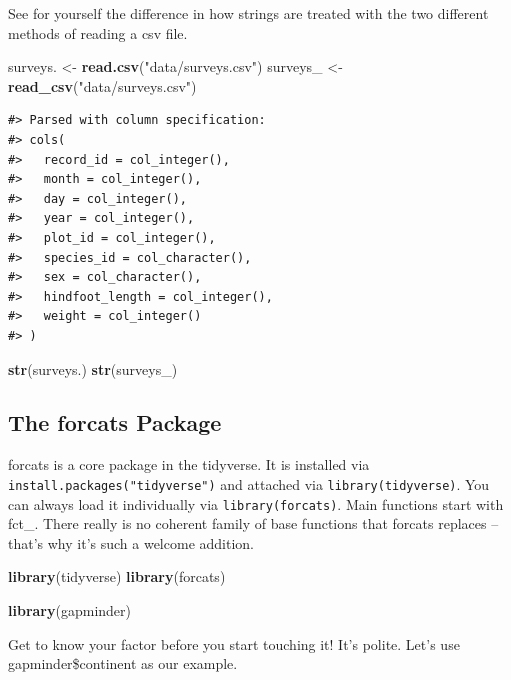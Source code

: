 \documentclass[]{book}
\newenvironment{Shaded}{\begin{snugshade}}{\end{snugshade}}
\newcommand{\KeywordTok}[1]{\textcolor[rgb]{0.13,0.29,0.53}{\textbf{#1}}}
\newcommand{\StringTok}[1]{\textcolor[rgb]{0.31,0.60,0.02}{#1}}
\newcommand{\NormalTok}[1]{#1}
\begin{document}
See for yourself the difference in how strings are treated with the two
different methods of reading a csv file.

\begin{Shaded}
\begin{Highlighting}[]
\NormalTok{surveys. <-}\StringTok{ }\KeywordTok{read.csv}\NormalTok{(}\StringTok{"data/surveys.csv"}\NormalTok{)}
\NormalTok{surveys_ <-}\StringTok{ }\KeywordTok{read_csv}\NormalTok{(}\StringTok{"data/surveys.csv"}\NormalTok{)}
\end{Highlighting}
\end{Shaded}

\begin{verbatim}
#> Parsed with column specification:
#> cols(
#>   record_id = col_integer(),
#>   month = col_integer(),
#>   day = col_integer(),
#>   year = col_integer(),
#>   plot_id = col_integer(),
#>   species_id = col_character(),
#>   sex = col_character(),
#>   hindfoot_length = col_integer(),
#>   weight = col_integer()
#> )
\end{verbatim}

\begin{Shaded}
\begin{Highlighting}[]
\KeywordTok{str}\NormalTok{(surveys.)}
\KeywordTok{str}\NormalTok{(surveys_)}
\end{Highlighting}
\end{Shaded}

\subsection{The forcats Package}\label{the-forcats-package}

forcats is a core package in the tidyverse. It is installed via
\texttt{install.packages("tidyverse")} and attached via
\texttt{library(tidyverse)}. You can always load it individually via
\texttt{library(forcats)}. Main functions start with fct\_. There really
is no coherent family of base functions that forcats replaces -- that's
why it's such a welcome addition.

\begin{Shaded}
\begin{Highlighting}[]
\KeywordTok{library}\NormalTok{(tidyverse)}
\KeywordTok{library}\NormalTok{(forcats)}


\KeywordTok{library}\NormalTok{(gapminder)}
\end{Highlighting}
\end{Shaded}

Get to know your factor before you start touching it! It's polite. Let's
use gapminder\$continent as our example.
\end{document}
